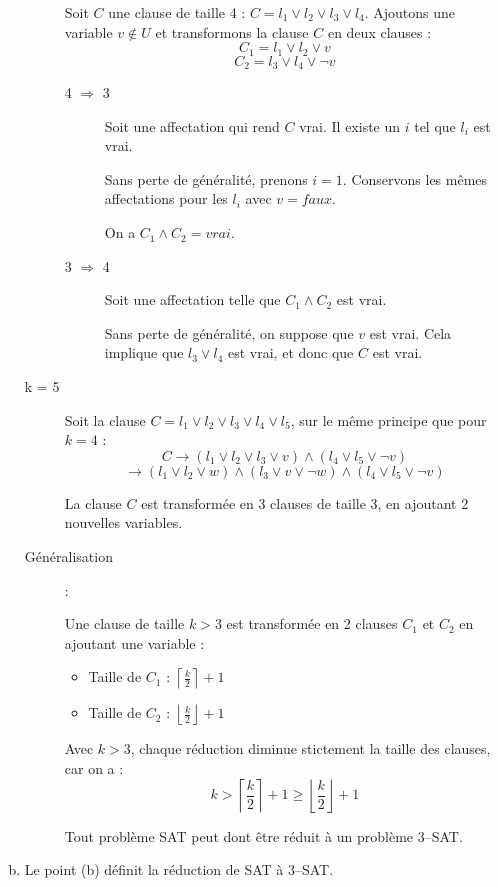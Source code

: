 \begin{enumerate}[(a)]
\begin{description}
Soit $C$ une clause de taille 4 : $C = l_1 \vee l_2 \vee l_3 \vee l_4$.
Ajoutons une variable $v \notin U$ et transformons la clause $C$ en deux clauses :
\[ C_1 = l_1 \vee l_2 \vee v \]
\[ C_2 = l_3 \vee l_4 \vee \neg v \]
\begin{description}
\item [4 $\Rightarrow$ 3]
Soit une affectation qui rend $C$ vrai. Il existe un $i$ tel que $l_i$ est vrai.

Sans perte de généralité, prenons $i = 1$. Conservons les mêmes affectations pour les $l_i$ avec $v = faux$.

On a $C_1 \wedge C_2 = vrai$.
\item [3 $\Rightarrow$ 4]
Soit une affectation telle que $C_1 \wedge C_2$ est vrai.

Sans perte de généralité, on suppose que $v$ est vrai. Cela implique que $l_3 \vee l_4$ est vrai, et donc que $C$ est vrai.
\end{description}

\item[k = 5]

Soit la clause $C = l_1 \vee l_2 \vee l_3 \vee l_4 \vee l_5$, sur le même principe que pour $k = 4$ :
\[C \rightarrow (l_1 \vee l_2 \vee l_3 \vee v) \wedge (l_4 \vee l_5 \vee \neg v) \]
\[\rightarrow (l_1 \vee l_2 \vee w) \wedge (l_3 \vee v \vee \neg w) \wedge (l_4 \vee l_5 \vee \neg v)\]

La clause $C$ est transformée en 3 clauses de taille 3, en ajoutant 2 nouvelles variables.

\item [Généralisation] :

Une clause de taille $k > 3$ est transformée en 2 clauses $C_1$ et $C_2$ en ajoutant une variable :
\begin{itemize}
\item Taille de $C_1$ : $\left \lceil \frac{k}{2} \right \rceil + 1$
\item Taille de $C_2$ : $\left \lfloor \frac{k}{2} \right \rfloor + 1$
\end{itemize}
Avec $k > 3$, chaque réduction diminue stictement la taille des clauses, car on a : \[ k > \left \lceil \frac{k}{2} \right \rceil + 1 \geq \left \lfloor \frac{k}{2} \right \rfloor + 1 \]

Tout problème SAT peut dont être réduit à un problème 3--SAT.

\end{description}

\item Le point (b) définit la réduction de SAT à 3--SAT.


\end{enumerate}
